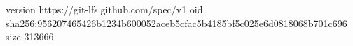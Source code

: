version https://git-lfs.github.com/spec/v1
oid sha256:956207465426b1234b600052aceb5cfac5b4185bf5c025e6d0818068b701c696
size 313666
